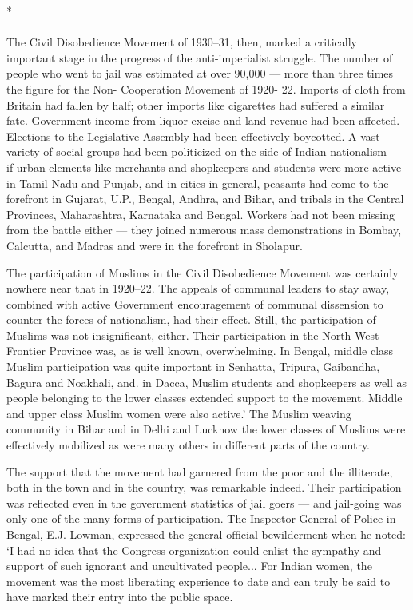 \begin{center}*\end{center}

\paragraph*{}


The Civil Disobedience Movement of 1930--31, then, marked a critically important stage in the progress of the anti-imperialist struggle. The number of people who went to jail was estimated at over 90,000 --- more than three times the figure for the Non- Cooperation Movement of 1920- 22. Imports of cloth from Britain had fallen by half; other imports like cigarettes had suffered a similar fate. Government income from liquor excise and land revenue had been affected. Elections to the Legislative Assembly had been effectively boycotted. A vast variety of social groups had been politicized on the side of Indian nationalism --- if urban elements like merchants and shopkeepers and students were more active in Tamil Nadu and Punjab, and in cities in general, peasants had come to the forefront in Gujarat, U.P., Bengal, Andhra, and Bihar, and tribals in the Central Provinces, Maharashtra, Karnataka and Bengal. Workers had not been missing from the battle either --- they joined numerous mass demonstrations in Bombay, Calcutta, and Madras and were in the forefront in Sholapur.

The participation of Muslims in the Civil Disobedience Movement was certainly nowhere near that in 1920--22. The appeals of communal leaders to stay away, combined with active Government encouragement of communal dissension to counter the forces of nationalism, had their effect. Still, the participation of Muslims was not insignificant, either. Their participation in the North-West Frontier Province was, as is well known, overwhelming. In Bengal, middle class Muslim participation was quite important in Senhatta, Tripura, Gaibandha, Bagura and Noakhali, and. in Dacca, Muslim students and shopkeepers as well as people belonging to the lower classes extended support to the movement. Middle and upper class Muslim women were also active.' The Muslim weaving community in Bihar and in Delhi and Lucknow the lower classes of Muslims were effectively mobilized as were many others in different parts of the country.

The support that the movement had garnered from the poor and the illiterate, both in the town and in the country, was remarkable indeed. Their participation was reflected even in the government statistics of jail goers --- and jail-going was only one of the many forms of participation. The Inspector-General of Police in Bengal, E.J. Lowman, expressed the general official bewilderment when he noted: `I had no idea that the Congress organization could enlist the sympathy and support of such ignorant and uncultivated people... For Indian women, the movement was the most liberating experience to date and can truly be said to have marked their entry into the public space.
